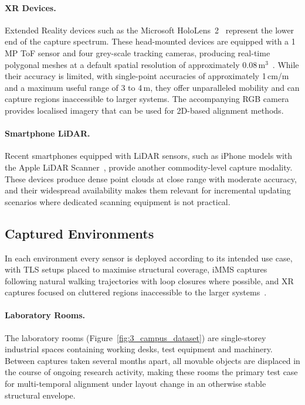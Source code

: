 \paragraph{XR Devices.}
Extended Reality devices such as the Microsoft HoloLens~2~\cite{hubner_evaluation_2020} represent the lower end of the capture spectrum. These head-mounted devices are equipped with a 1\,MP \gls{ToF} sensor and four grey-scale tracking cameras, producing real-time polygonal meshes at a default spatial resolution of approximately 0.08\,m$^3$~\cite{geyter_point_2022, hubner_evaluation_2020}. While their accuracy is limited, with single-point accuracies of approximately 1\,cm/m and a maximum useful range of 3 to 4\,m, they offer unparalleled mobility and can capture regions inaccessible to larger systems. The accompanying RGB camera provides localised imagery that can be used for 2D-based alignment methods.

\paragraph{Smartphone LiDAR.}
Recent smartphones equipped with LiDAR sensors, such as iPhone models with the Apple LiDAR Scanner~\cite{abdel-majeed_indoor_2024}, provide another commodity-level capture modality. These devices produce dense point clouds at close range with moderate accuracy, and their widespread availability makes them relevant for incremental updating scenarios where dedicated scanning equipment is not practical.

\subsection{Captured Environments}
\label{sec:3_captured_scenes}

In each environment every sensor is deployed according to its intended use case, with \gls{TLS} setups placed to maximise structural coverage, \gls{iMMS} captures following natural walking trajectories with loop closures where possible, and \gls{XR} captures focused on cluttered regions inaccessible to the larger systems~\cite{geyter_point_2022}.

\paragraph{Laboratory Rooms.} The laboratory rooms (Figure~\ref{fig:3_campus_dataset}) are single-storey industrial spaces containing working desks, test equipment and machinery. Between captures taken several months apart, all movable objects are displaced in the course of ongoing research activity, making these rooms the primary test case for multi-temporal alignment under layout change in an otherwise stable structural envelope.

